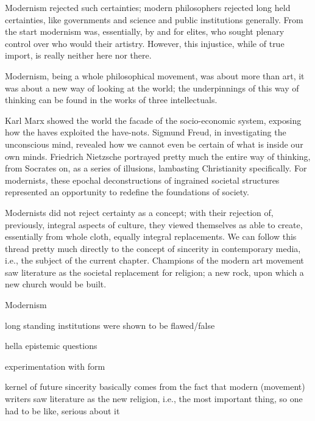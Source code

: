 \documentclass[../butidigress.tex]{subfiles}
\begin{document}
Modernism rejected such certainties; modern philosophers rejected long held certainties, like governments and science and public institutions generally.
From the start modernism was, essentially, by and for elites\autocite[2]{cambridgemodern}, who sought plenary control over who would  their artistry.
However, this injustice, while of true import, is really neither here nor there.

Modernism, being a whole philosophical movement, was about more than art, it was about a new way of looking at the world; the underpinnings of this way of thinking can be found in the works of three intellectuals\autocite[9]{cambridgemodern}.

Karl Marx showed the world the facade of the socio-economic system, exposing how the haves exploited the have-nots.
Sigmund Freud, in investigating the unconscious mind, revealed how we cannot even be certain of what is inside our own minds.
Friedrich Nietzsche portrayed pretty much the entire  way of thinking, from Socrates on, as a series of illusions, lambasting Christianity specifically.
For modernists, these epochal deconstructions of ingrained societal structures represented an opportunity to redefine the foundations of society.

Modernists did not reject certainty as a concept; with their rejection of, previously, integral aspects of culture, they viewed themselves as able to create, essentially from whole cloth, equally integral replacements.
We can follow this thread pretty much directly to the concept of sincerity in contemporary media, i.e., the subject of the current chapter.
Champions of the modern art movement saw literature as the societal replacement for religion; a new rock, upon which a new church would be built.

\begin{somenotes}{Modernism}
    \item long standing institutions were shown to be flawed/false
    \item hella epistemic questions
    \item experimentation with form
    \item kernel of future sincerity basically comes from the fact that modern (movement) writers saw literature as the new religion, i.e., the most important thing, so one had to be like, serious about it
\end{somenotes}
\end{document}
